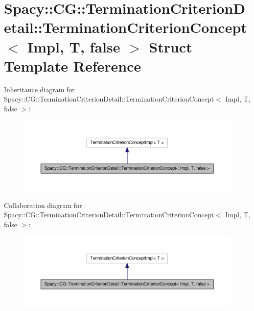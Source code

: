 \hypertarget{structSpacy_1_1CG_1_1TerminationCriterionDetail_1_1TerminationCriterionConcept_3_01Impl_00_01T_00_01false_01_4}{\section{\-Spacy\-:\-:\-C\-G\-:\-:\-Termination\-Criterion\-Detail\-:\-:\-Termination\-Criterion\-Concept$<$ \-Impl, \-T, false $>$ \-Struct \-Template \-Reference}
\label{structSpacy_1_1CG_1_1TerminationCriterionDetail_1_1TerminationCriterionConcept_3_01Impl_00_01T_00_01false_01_4}
}


\-Inheritance diagram for \-Spacy\-:\-:\-C\-G\-:\-:\-Termination\-Criterion\-Detail\-:\-:\-Termination\-Criterion\-Concept$<$ \-Impl, \-T, false $>$\-:
\nopagebreak
\begin{figure}[H]
\begin{center}
\leavevmode
\includegraphics[width=350pt]{structSpacy_1_1CG_1_1TerminationCriterionDetail_1_1TerminationCriterionConcept_3_01Impl_00_01T_00_01false_01_4__inherit__graph}
\end{center}
\end{figure}


\-Collaboration diagram for \-Spacy\-:\-:\-C\-G\-:\-:\-Termination\-Criterion\-Detail\-:\-:\-Termination\-Criterion\-Concept$<$ \-Impl, \-T, false $>$\-:
\nopagebreak
\begin{figure}[H]
\begin{center}
\leavevmode
\includegraphics[width=350pt]{structSpacy_1_1CG_1_1TerminationCriterionDetail_1_1TerminationCriterionConcept_3_01Impl_00_01T_00_01false_01_4__coll__graph}
\end{center}
\end{figure}
